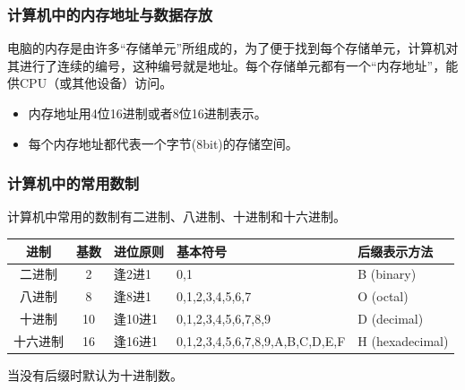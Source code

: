 \begin{frame}
    \frametitle{计算机中的内存地址与数据存放}
    \begin{minipage}{0.68\linewidth}

        电脑的内存是由许多“存储单元”所组成的，为了便于找到每个存储单元，计算机对其进行了连续的编号，这种编号就是地址。每个存储单元都有一个“内存地址”，能供CPU（或其他设备）访问。
        \begin{itemize}
          \item 内存地址用4位16进制或者8位16进制表示。
          \item 每个内存地址都代表一个字节(8bit)的存储空间。
        \end{itemize}
    \end{minipage}\hfill
    \begin{minipage}{0.28\linewidth}
    \end{minipage}
\end{frame}

\begin{frame}
    \frametitle{计算机中的常用数制}
    计算机中常用的数制有二进制、八进制、十进制和十六进制。

    \begin{table}
        \centering
        \begin{tabular}{cclll}
            \toprule 
           进制 & 基数 & 进位原则 & 基本符号 & 后缀表示方法 \\ \midrule
           二进制 & 2 & 逢2进1 & 0,1 & B (binary) \\
           八进制 & 8 & 逢8进1 & 0,1,2,3,4,5,6,7 & O (octal) \\
           十进制 & 10 & 逢10进1 & 0,1,2,3,4,5,6,7,8,9 & D (decimal) \\
           十六进制 & 16 & 逢16进1 & 0,1,2,3,4,5,6,7,8,9,A,B,C,D,E,F & H (hexadecimal) \\
           \bottomrule
        \end{tabular}
    \end{table}

    \remark 当没有后缀时默认为十进制数。
\end{frame}



